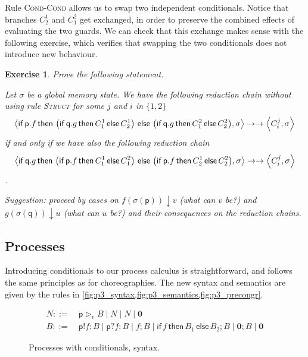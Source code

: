\documentclass[a4paper,12pt]{article}
\newtheorem{exercise}{Exercise}
\newcommand*{\pp}{\ensuremath{\mathop{\boldsymbol{|}}}}
\newcommand*{\m}[1]{\ensuremath{\mathsf{#1}}}
\newcommand*{\pid}[1]{\m{#1}}
\newcommand*{\nil}{\ensuremath{\boldsymbol{0}}\xspace}
\newcommand*{\rname}[1]{\textsc{#1}}
\newcommand*{\procv}[3]{\ensuremath{{#1} \triangleright_{#2} #3}}
\newcommand*{\psendf}[2]{\ensuremath{{#1}!#2}}
\newcommand*{\precvf}[2]{\ensuremath{{#1}?#2}}
\newcommand*{\cond}[3]{\m{if}\, #1 \, \m{then} \, #2 \, \m{else} \, #3}
\newcommand*{\eval}{\ensuremath{\mathop{\downarrow}}\xspace}
\begin{document}
Rule \rname{Cond-Cond} allows us to swap two independent conditionals. Notice that branches 
$C^1_2$ and $C^2_1$ get exchanged, in order to preserve the combined effects of evaluating the 
two guards.
We can check that this exchange makes sense with the following exercise, which verifies that 
swapping the two conditionals does not introduce new behaviour.

\begin{exercise}
Prove the following statement.

Let $\sigma$ be a global memory state. We have the following reduction chain without using 
rule \rname{Struct} for some $j$ and $i$ in $\{1,2\}$
\[
\rc{\cond{\pid p.f}{\left(\cond{\pid q.g}{C_1^1}{C_2^1}\right)}
	{\left(\cond{\pid q.g}{C_1^2}{C_2^2}\right)}}[\sigma]
\to \to 
\rc{C^j_i}[\sigma]
\]
if and only if we have also the following reduction chain
\[
\rc{\cond{\pid q.g}{\left(\cond{\pid p.f}{C_1^1}{C_1^2}\right)}
	{\left(\cond{\pid p.f}{C_2^1}{C_2^2}\right)}}[\sigma]
\to \to 
\rc{C^j_i}[\sigma]
\]
.

Suggestion: proceed by cases on $f(\sigma(\pid p)) \eval v$ (what can $v$ be?) and $g(\sigma(\pid 
q)) \eval u$ (what can $u$ be?) and their consequences on the reduction chains.
\end{exercise}


\subsection{Processes}

Introducing conditionals to our process calculus is straightforward, and follows the same 
principles as for choreographies. The new syntax and semantics are given by the rules in 
\cref{fig:p3_syntax,fig:p3_semantics,fig:p3_precongr}.

\begin{figure}
\begin{align*}
N ::=\ & \procv{\pid p}v{B} \mid N \pp N \mid \nil
\\
B ::=\ & \psendf{\pid p}f;B \mid \precvf{\pid p}f;B \mid f;B \mid
\cond{f}{B_1}{B_2};B \mid \nil; B \mid 
\nil
\end{align*}
\caption{Processes with conditionals, syntax.}
\label{fig:p3_syntax}
\end{figure}
\end{document}
